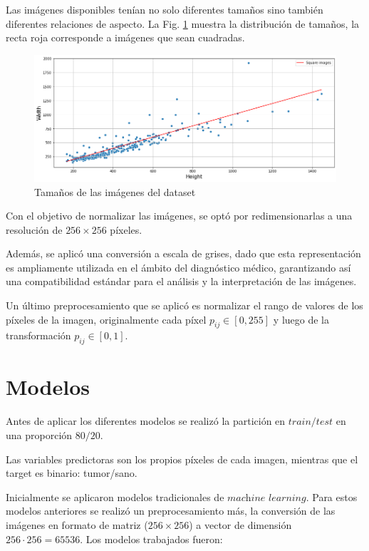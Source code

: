 Las imágenes disponibles tenían no solo diferentes tamaños sino también diferentes relaciones de aspecto. La Fig. \ref{fig.relaciones} muestra la distribución de tamaños, la recta roja corresponde a imágenes que sean cuadradas.

\begin{figure}[H]
\centering
        \includegraphics[width=\linewidth]{chapters/deteccion/images/relaciones.png}
        \caption{Tamaños de las imágenes del dataset}
        \label{fig.relaciones}
  \end{figure}

Con el objetivo de normalizar las imágenes, se optó por redimensionarlas a una resolución de $256 \times 256$ píxeles. 

Además, se aplicó una conversión a escala de grises, dado que esta representación es ampliamente utilizada en el ámbito del diagnóstico médico, garantizando así una compatibilidad estándar para el análisis y la interpretación de las imágenes.

Un último preprocesamiento que se aplicó es normalizar el rango de valores de los píxeles de la imagen, originalmente cada píxel $p_{ij}\in [0,255]$ y luego de la transformación $p_{ij}\in [0,1]$.

\section{Modelos}

Antes de aplicar los diferentes modelos se realizó la partición en $train/test$ en una proporción $80/20$. 

Las variables predictoras son los propios píxeles de cada imagen, mientras que el target es binario: tumor/sano. 

Inicialmente se aplicaron modelos tradicionales de $\textit{machine learning}$. Para estos modelos anteriores se realizó un preprocesamiento más, la conversión de las imágenes en formato de matriz ($256\times256$) a vector de dimensión $256\cdot256=65536$. Los modelos trabajados fueron:

